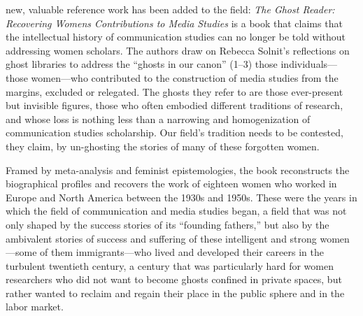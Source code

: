 \documentclass{tufte-handout}
\begin{document}

\noindent new, valuable reference work has been added to the field: \emph{The Ghost Reader: Recovering Women\textquotesingle s Contributions
to Media Studies} is a book that claims that the intellectual history of
communication studies can no longer be told without addressing women
scholars. 
The authors draw on Rebecca Solnit's reflections on ghost
libraries to address the ``ghosts in our canon'' (1--3) those
individuals---those women---who contributed to the construction of media
studies from the margins, excluded or relegated. The ghosts they refer
to are those ever-present but invisible figures, those who often
embodied different traditions of research, and whose loss is nothing
less than a narrowing and homogenization of communication studies
scholarship. Our field's tradition needs to be contested, they claim, by
un-ghosting the stories of many of these forgotten women.

Framed by meta-analysis and feminist epistemologies, the book
reconstructs the biographical profiles and recovers the work of eighteen
women who worked in Europe and North America between the 1930s and
1950s. These were the years in which the field of communication and
media studies began, a field that was not only shaped by the success
stories of its ``founding fathers,'' but also by the ambivalent stories
of success and suffering of these intelligent and strong women---some of
them immigrants---who lived and developed their careers in the turbulent
twentieth century, a century that was particularly hard for women
researchers who did not want to become ghosts confined in private
spaces, but rather wanted to reclaim and regain their place in the
public sphere and in the labor market.
\end{document}
